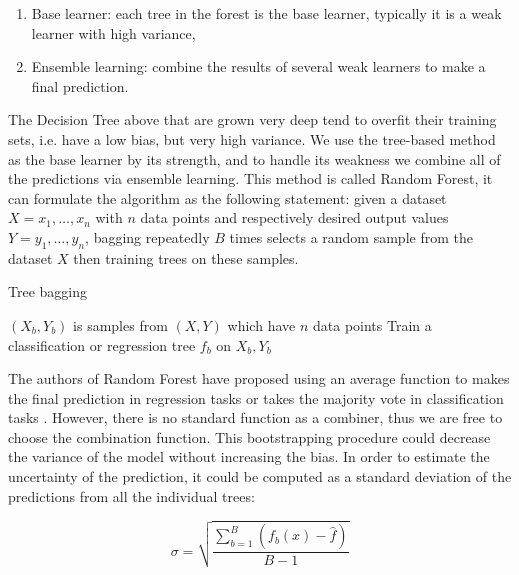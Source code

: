\begin{enumerate}
\item Base learner: each tree in the forest is the base learner, typically it is a weak learner with high variance,
\item Ensemble learning: combine the results of several weak learners to make a final prediction.
\end{enumerate}


The Decision Tree above that are grown very deep tend to overfit their training sets, i.e. have a low bias, but very high variance. We use the tree-based method as the base learner by its strength, and to handle its weakness we combine all of the predictions via ensemble learning. This method is called Random Forest, it can formulate the algorithm as the following statement: given a dataset $X = x_1, \dots, x_n$ with $n$ data points and respectively desired output values $Y = y_1, \dots, y_n$, bagging repeatedly $B$ times selects a random sample from the dataset $X$ then training trees on these samples.


\begin{algorithm}
   \caption{Tree bagging}
    \begin{algorithmic}

            \State $(X_b, Y_b)$ is samples from $(X, Y)$ which have $n$ data points
            \State Train a classification or regression tree $f_b$ on $X_b, Y_b$
        \EndFor
        
       \EndFunction

\end{algorithmic}
\end{algorithm}


The authors of Random Forest have proposed using an average function to makes the final prediction in regression tasks or takes the majority vote in classification tasks \citep{breiman2001random}. However, there is no standard function as a combiner, thus we are free to choose the combination function. This bootstrapping procedure could decrease the variance of the model without increasing the bias. In order to estimate the uncertainty of the prediction, it could be computed as a standard deviation of the predictions from all the individual trees:

\begin{equation}
\sigma = \sqrt{ \dfrac{ \sum_{b=1}^B ( f_b(x) - \hat{f} ) }{ B - 1 } }
\end{equation}

